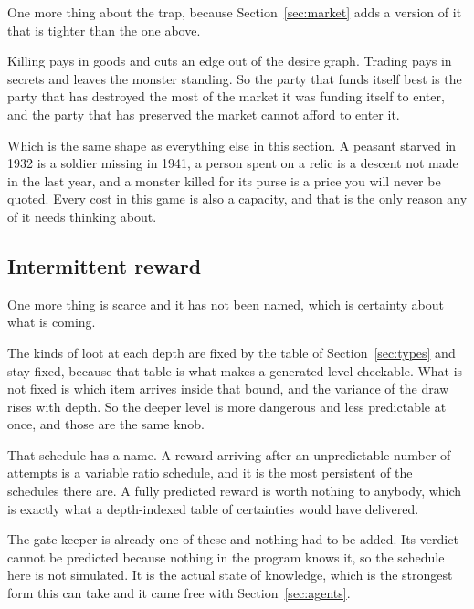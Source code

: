 \documentclass[11pt,a4paper]{article}
\begin{document}
One more thing about the trap, because Section~\ref{sec:market} adds a version of it that is
tighter than the one above.

Killing pays in goods and cuts an edge out of the desire graph. Trading pays in secrets and leaves
the monster standing. So the party that funds itself best is the party that has destroyed the most
of the market it was funding itself to enter, and the party that has preserved the market cannot
afford to enter it.

\begin{sectionbox}
Which is the same shape as everything else in this section. A peasant starved in 1932 is a soldier
missing in 1941, a person spent on a relic is a descent not made in the last year, and a monster
killed for its purse is a price you will never be quoted. Every cost in this game is also a
capacity, and that is the only reason any of it needs thinking about.
\end{sectionbox}

\subsection{Intermittent reward}
\label{sec:intermittent}

One more thing is scarce and it has not been named, which is certainty about what is coming.

The kinds of loot at each depth are fixed by the table of Section~\ref{sec:types} and stay fixed,
because that table is what makes a generated level checkable. What is not fixed is which item
arrives inside that bound, and the variance of the draw rises with depth. So the deeper level is
more dangerous and less predictable at once, and those are the same knob.

That schedule has a name. A reward arriving after an unpredictable number of attempts is a
variable ratio schedule, and it is the most persistent of the schedules there are. A fully
predicted reward is worth nothing to anybody, which is exactly what a depth-indexed table of
certainties would have delivered.

\begin{sectionbox}
The gate-keeper is already one of these and nothing had to be added. Its verdict cannot be predicted
because nothing in the program knows it, so the schedule here is not simulated. It is the actual
state of knowledge, which is the strongest form this can take and it came free with
Section~\ref{sec:agents}.
\end{sectionbox}
\end{document}

